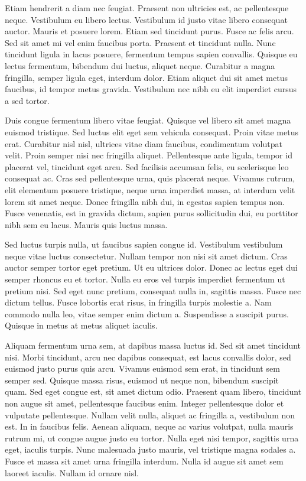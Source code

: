 \documentclass[journal]{IEEEtran}
\begin{document}
Etiam hendrerit a diam nec feugiat. Praesent non ultricies est, ac pellentesque neque. Vestibulum eu libero lectus. Vestibulum id justo vitae libero consequat auctor. Mauris et posuere lorem. Etiam sed tincidunt purus. Fusce ac felis arcu. Sed sit amet mi vel enim faucibus porta. Praesent et tincidunt nulla. Nunc tincidunt ligula in lacus posuere, fermentum tempus sapien convallis. Quisque eu lectus fermentum, bibendum dui luctus, aliquet neque. Curabitur a magna fringilla, semper ligula eget, interdum dolor. Etiam aliquet dui sit amet metus faucibus, id tempor metus gravida. Vestibulum nec nibh eu elit imperdiet cursus a sed tortor.

Duis congue fermentum libero vitae feugiat. Quisque vel libero sit amet magna euismod tristique. Sed luctus elit eget sem vehicula consequat. Proin vitae metus erat. Curabitur nisl nisl, ultrices vitae diam faucibus, condimentum volutpat velit. Proin semper nisi nec fringilla aliquet. Pellentesque ante ligula, tempor id placerat vel, tincidunt eget arcu. Sed facilisis accumsan felis, eu scelerisque leo consequat ac. Cras sed pellentesque urna, quis placerat neque. Vivamus rutrum, elit elementum posuere tristique, neque urna imperdiet massa, at interdum velit lorem sit amet neque. Donec fringilla nibh dui, in egestas sapien tempus non. Fusce venenatis, est in gravida dictum, sapien purus sollicitudin dui, eu porttitor nibh sem eu lacus. Mauris quis luctus massa.

Sed luctus turpis nulla, ut faucibus sapien congue id. Vestibulum vestibulum neque vitae luctus consectetur. Nullam tempor non nisi sit amet dictum. Cras auctor semper tortor eget pretium. Ut eu ultrices dolor. Donec ac lectus eget dui semper rhoncus eu et tortor. Nulla eu eros vel turpis imperdiet fermentum ut pretium nisi. Sed eget nunc pretium, consequat nulla in, sagittis massa. Fusce nec dictum tellus. Fusce lobortis erat risus, in fringilla turpis molestie a. Nam commodo nulla leo, vitae semper enim dictum a. Suspendisse a suscipit purus. Quisque in metus at metus aliquet iaculis.

Aliquam fermentum urna sem, at dapibus massa luctus id. Sed sit amet tincidunt nisi. Morbi tincidunt, arcu nec dapibus consequat, est lacus convallis dolor, sed euismod justo purus quis arcu. Vivamus euismod sem erat, in tincidunt sem semper sed. Quisque massa risus, euismod ut neque non, bibendum suscipit quam. Sed eget congue est, sit amet dictum odio. Praesent quam libero, tincidunt non augue sit amet, pellentesque faucibus enim. Integer pellentesque dolor et vulputate pellentesque. Nullam velit nulla, aliquet ac fringilla a, vestibulum non est. In in faucibus felis. Aenean aliquam, neque ac varius volutpat, nulla mauris rutrum mi, ut congue augue justo eu tortor. Nulla eget nisi tempor, sagittis urna eget, iaculis turpis. Nunc malesuada justo mauris, vel tristique magna sodales a. Fusce et massa sit amet urna fringilla interdum. Nulla id augue sit amet sem laoreet iaculis. Nullam id ornare nisl.
\end{document}
